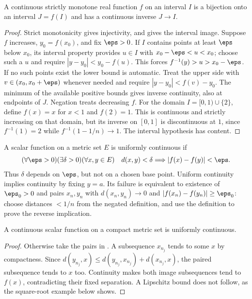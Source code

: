 \begin{theorem}
A continuous strictly monotone real function $f$ on an interval $I$ is a bijection onto an interval $J=f(I)$ and has a continuous inverse $J\to I$.
\end{theorem}
\begin{proof}
Strict monotonicity gives injectivity, and  gives the interval image. Suppose $f$ increases, $y_0=f(x_0)$, and fix $\eps>0$. If $I$ contains points at least $\eps$ below $x_0$, its interval property provides $u\in I$ with $x_0-\eps<u<x_0$; choose such a $u$ and require $|y-y_0|<y_0-f(u)$. This forces $f^{-1}(y)>u>x_0-\eps$. If no such points exist the lower bound is automatic. Treat the upper side with $v\in(x_0,x_0+\eps)$ whenever needed and require $|y-y_0|<f(v)-y_0$. The minimum of the available positive bounds gives inverse continuity, also at endpoints of $J$. Negation treats decreasing $f$.
For the domain $I=[0,1)\cup\{2\}$, define $f(x)=x$ for $x<1$ and $f(2)=1$. This is continuous and strictly increasing on that domain, but its inverse on $[0,1]$ is discontinuous at $1$, since $f^{-1}(1)=2$ while $f^{-1}(1-1/n)\to1$. The interval hypothesis has content.
\end{proof}

\begin{definition}
A scalar function on a metric set $E$ is uniformly continuous if
\[ (\forall\eps>0)(\exists\delta>0)(\forall x,y\in E)\quad d(x,y)<\delta\Longrightarrow |f(x)-f(y)|<\eps. \]
Thus $\delta$ depends on $\eps$, but not on a chosen base point. Uniform continuity implies continuity by fixing $y=a$. Its failure is equivalent to existence of $\eps_0>0$ and pairs $x_n,y_n$ with $d(x_n,y_n)\to0$ and $|f(x_n)-f(y_n)|\ge\eps_0$: choose distances $<1/n$ from the negated definition, and use the definition to prove the reverse implication.
\end{definition}

\begin{theorem}
A continuous scalar function on a compact metric set is uniformly continuous.
\end{theorem}
\begin{proof}
Otherwise take the pairs in . A subsequence $x_{n_j}$ tends to some $x$ by compactness. Since $d(y_{n_j},x)\le d(y_{n_j},x_{n_j})+d(x_{n_j},x)$, the paired subsequence tends to $x$ too. Continuity makes both image subsequences tend to $f(x)$, contradicting their fixed separation. A Lipschitz bound does not follow, as the square-root example below shows.
\end{proof}

